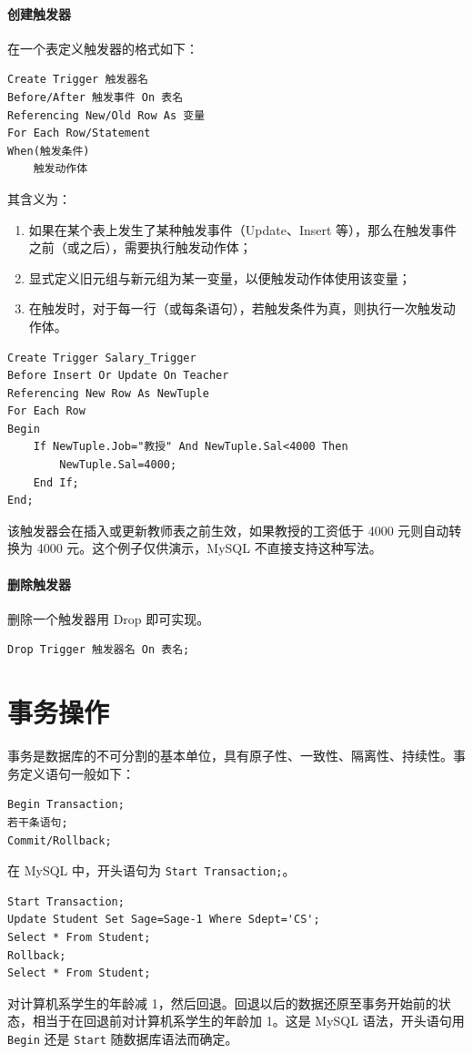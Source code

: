\documentclass[UTF8]{ctexart}
\begin{document}
\paragraph{创建触发器} 在一个表定义触发器的格式如下：
\begin{lstlisting}
Create Trigger 触发器名
Before/After 触发事件 On 表名
Referencing New/Old Row As 变量
For Each Row/Statement
When(触发条件)
    触发动作体
\end{lstlisting}
其含义为：
\begin{enumerate}
    \item 如果在某个表上发生了某种触发事件（Update、Insert 等），那么在触发事件之前（或之后），需要执行触发动作体；
    \item 显式定义旧元组与新元组为某一变量，以便触发动作体使用该变量；
    \item 在触发时，对于每一行（或每条语句），若触发条件为真，则执行一次触发动作体。
\end{enumerate}

\begin{lstlisting}[backgroundcolor=\color{white}]
Create Trigger Salary_Trigger
Before Insert Or Update On Teacher
Referencing New Row As NewTuple
For Each Row
Begin
    If NewTuple.Job="教授" And NewTuple.Sal<4000 Then
        NewTuple.Sal=4000;
    End If;
End;
\end{lstlisting}
该触发器会在插入或更新教师表之前生效，如果教授的工资低于 4000 元则自动转换为 4000 元。这个例子仅供演示，MySQL 不直接支持这种写法。 

\paragraph{删除触发器} 删除一个触发器用 Drop 即可实现。
\begin{lstlisting}
Drop Trigger 触发器名 On 表名;
\end{lstlisting}

\section{事务操作}
事务是数据库的不可分割的基本单位，具有原子性、一致性、隔离性、持续性。事务定义语句一般如下：
\begin{lstlisting}
Begin Transaction;
若干条语句;
Commit/Rollback;
\end{lstlisting}

在 MySQL 中，开头语句为 \verb!Start Transaction;!。

\begin{lstlisting}[backgroundcolor=\color{white}]
Start Transaction;
Update Student Set Sage=Sage-1 Where Sdept='CS';
Select * From Student;
Rollback;
Select * From Student;
\end{lstlisting}
对计算机系学生的年龄减 1，然后回退。回退以后的数据还原至事务开始前的状态，相当于在回退前对计算机系学生的年龄加 1。这是 MySQL 语法，开头语句用 \verb!Begin! 还是 \verb!Start! 随数据库语法而确定。
\end{document}
